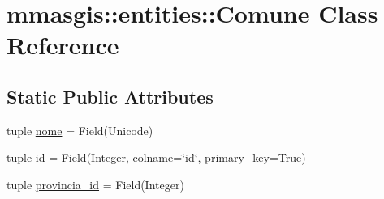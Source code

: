 \hypertarget{classmmasgis_1_1entities_1_1Comune}{
\section{mmasgis::entities::Comune Class Reference}
\label{classmmasgis_1_1entities_1_1Comune}
}
\subsection*{Static Public Attributes}
\begin{DoxyCompactItemize}
\item 
tuple \hyperlink{classmmasgis_1_1entities_1_1Comune_a93657c0ac0d0a8db86ac2e359f6f7b63}{nome} = Field(Unicode)
\item 
tuple \hyperlink{classmmasgis_1_1entities_1_1Comune_a5c61ab3206f4829b3ea5e5b3343569fa}{id} = Field(Integer, colname=\char`\"{}id\char`\"{}, primary\_\-key=True)
\item 
tuple \hyperlink{classmmasgis_1_1entities_1_1Comune_adbd00de282780b1f231323edf44defc8}{provincia\_\-id} = Field(Integer)
\end{DoxyCompactItemize}


